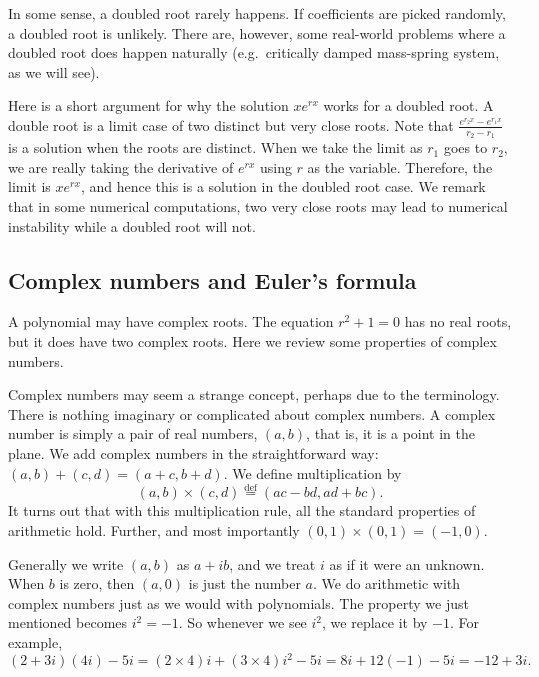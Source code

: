 In some sense, a doubled root rarely happens.  If coefficients are 
picked randomly, a doubled root is unlikely.
There are, however, some real-world problems
where a doubled root does happen naturally (e.g.\ critically damped
mass-spring system, as we will see).

Here is a short argument for why the solution $x e^{r x}$ works for a
doubled root.
A double root is a limit case of
two distinct but very close roots.  Note that 
$\frac{e^{r_2 x} - e^{r_1 x}}{r_2 - r_1}$ is a solution when the roots are
distinct.  When we take the limit as $r_1$ goes to $r_2$, we are really
taking the
derivative of $e^{rx}$ using $r$ as the variable.  Therefore, the limit is 
$x e^{rx}$, and hence this is a solution in the doubled root case.
We remark that in some numerical computations,
two very close roots may lead to numerical instability while
a doubled root will not.

\subsection{Complex numbers and Euler's formula}

A polynomial may have complex roots.  The
equation $r^2 + 1 = 0$ has no real roots, but it does have two complex roots.
Here we review some properties of complex numbers.

Complex numbers may seem a strange concept, perhaps due to the
terminology.  There is nothing imaginary or complicated about complex
numbers.
A complex number is simply a pair of real numbers, $(a,b)$,  
that is,
it is a point in the plane.  We add complex numbers
in the straightforward way: $(a,b)+(c,d)=(a+c,b+d)$.  We define
multiplication by
\begin{equation*}
(a,b) \times (c,d) \overset{\text{def}}{=} (ac-bd,ad+bc) .
\end{equation*}
It turns out that with this multiplication rule, all the standard properties
of arithmetic hold.  Further, and most importantly $(0,1) \times (0,1) =
(-1,0)$.

Generally we write $(a,b)$ as $a+ib$, and we treat $i$ as if it were an
unknown.  When $b$ is zero, then $(a,0)$ is just the number $a$.
We do arithmetic with complex numbers just as we would
with polynomials.
The property we just mentioned becomes $i^2 = -1$.
So whenever we see $i^2$, we replace it by $-1$.
For example,
\begin{equation*}
(2+3i)(4i) - 5i = 
(2\times 4)i + (3 \times 4) i^2 - 5i
=
8i + 12 (-1) - 5i
=
-12 + 3i .
\end{equation*}

